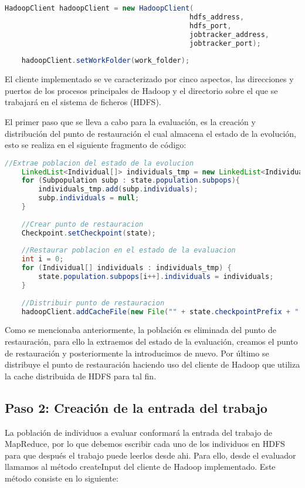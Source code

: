 \begin{lstlisting}[language=Java]
	HadoopClient hadoopClient = new HadoopClient(
											hdfs_address,
											hdfs_port,
											jobtracker_address,
											jobtracker_port);
			
	hadoopClient.setWorkFolder(work_folder);
\end{lstlisting}

El cliente implementado se ve caracterizado por cinco aspectos, las direcciones y puertos de los procesos principales de Hadoop y el directorio sobre el que se trabajar\'a en el sistema de ficheros (HDFS).

El primer paso que se lleva a cabo para la evaluación, es la creación y distribución del punto de restauración el cual almacena el estado de la evolución, esto se realiza en el siguiente fragmento de código:

\begin{lstlisting}[language=Java]
	//Extrae poblacion del estado de la evolucion
	LinkedList<Individual[]> individuals_tmp = new LinkedList<Individual[]>();
	for (Subpopulation subp : state.population.subpops){
		individuals_tmp.add(subp.individuals);
		subp.individuals = null;
	}
	
	//Crear punto de restauracion
	Checkpoint.setCheckpoint(state);
	
	//Restaurar poblacion en el estado de la evaluacion
	int i = 0;
	for (Individual[] individuals : individuals_tmp) {
		state.population.subpops[i++].individuals = individuals;
	}
			
	//Distribuir punto de restauracion
	hadoopClient.addCacheFile(new File("" + state.checkpointPrefix + "." + state.generation + ".gz"), true, true);
\end{lstlisting}

Como se mencionaba anteriormente, la población es eliminada del punto de restauración, para ello la extraemos del estado de la evaluación, creamos el punto de restauración y posteriormente la introducimos de nuevo. Por \'ultimo se distribuye el punto de restauración haciendo uso del cliente de Hadoop que utiliza la cache distribuida de HDFS para tal fin.

\subsection{Paso 2: Creación de la entrada del trabajo}

La población de individuos a evaluar conformar\'a la entrada del trabajo de MapReduce, por lo que debemos escribir cada uno de los individuos en HDFS para que después el trabajo puede leerlos desde ahi. Para ello, desde el evaluador llamamos al método createInput del cliente de Hadoop implementado. Este método consiste en lo siguiente:

